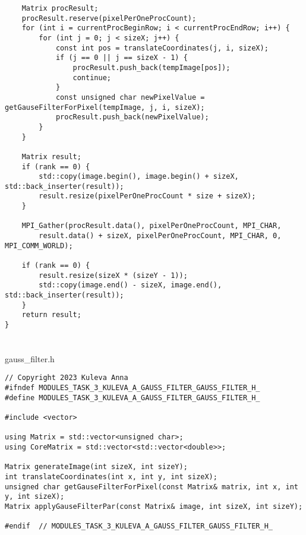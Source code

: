 \documentclass[12pt,a4paper]{article}
\begin{document}
\begin{lstlisting}
    Matrix procResult;
    procResult.reserve(pixelPerOneProcCount);
    for (int i = currentProcBeginRow; i < currentProcEndRow; i++) {
        for (int j = 0; j < sizeX; j++) {
            const int pos = translateCoordinates(j, i, sizeX);
            if (j == 0 || j == sizeX - 1) {
                procResult.push_back(tempImage[pos]);
                continue;
            }
            const unsigned char newPixelValue = getGauseFilterForPixel(tempImage, j, i, sizeX);
            procResult.push_back(newPixelValue);
        }
    }

    Matrix result;
    if (rank == 0) {
        std::copy(image.begin(), image.begin() + sizeX, std::back_inserter(result));
        result.resize(pixelPerOneProcCount * size + sizeX);
    }

    MPI_Gather(procResult.data(), pixelPerOneProcCount, MPI_CHAR,
        result.data() + sizeX, pixelPerOneProcCount, MPI_CHAR, 0, MPI_COMM_WORLD);

    if (rank == 0) {
        result.resize(sizeX * (sizeY - 1));
        std::copy(image.end() - sizeX, image.end(), std::back_inserter(result));
    }
    return result;
}

\end{lstlisting}

\section{} gauss\_filter.h
\begin{lstlisting}
// Copyright 2023 Kuleva Anna
#ifndef MODULES_TASK_3_KULEVA_A_GAUSS_FILTER_GAUSS_FILTER_H_
#define MODULES_TASK_3_KULEVA_A_GAUSS_FILTER_GAUSS_FILTER_H_

#include <vector>

using Matrix = std::vector<unsigned char>;
using CoreMatrix = std::vector<std::vector<double>>;

Matrix generateImage(int sizeX, int sizeY);
int translateCoordinates(int x, int y, int sizeX);
unsigned char getGauseFilterForPixel(const Matrix& matrix, int x, int y, int sizeX);
Matrix applyGauseFilterPar(const Matrix& image, int sizeX, int sizeY);

#endif  // MODULES_TASK_3_KULEVA_A_GAUSS_FILTER_GAUSS_FILTER_H_

\end{lstlisting}
\end{document}
